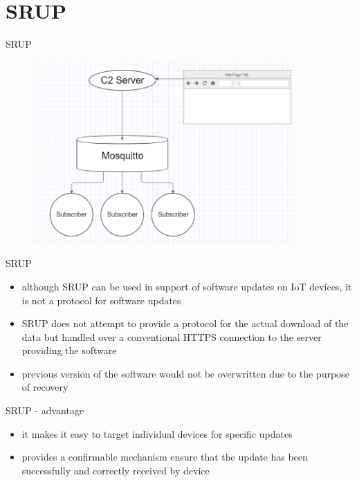 \documentclass{beamer}
\begin{document}
\section{SRUP}
\begin{frame}{SRUP}
    \begin{figure}[t]
        \centering
        \includegraphics[width=0.9\textwidth]{figures/SRUP.png}
    \end{figure}
\end{frame}

\begin{frame}{SRUP}
    \begin{itemize}
        \item{although SRUP can be used in support of software updates on IoT devices, it is not a protocol for software updates}
        \item{SRUP does not attempt to provide a protocol for the actual download of the data but handled over a conventional HTTPS connection to the server providing the software}
        \item{previous version of the software would not be overwritten due to the purpose of recovery}
    \end{itemize}
\end{frame}

\begin{frame}{SRUP - advantage}
    \begin{itemize}
        \item{it makes it easy to target individual devices for specific updates}
        \item{provides a confirmable mechanism ensure that the update has been successfully and correctly received by device}
    \end{itemize}
\end{frame}
\end{document}
